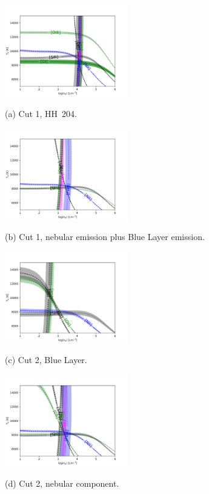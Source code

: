 \documentclass[twocolumn]{aastex63}
\begin{document}
\begin{figure}
\centering
  \begin{minipage}{7.5cm}
    \centering\includegraphics[height=4cm,width=\columnwidth]{physical_diag_HH204.png}

    \centerline{(a) Cut 1, HH~204.}
    \smallskip
  \end{minipage}
  \begin{minipage}{7.5cm}
    \centering\includegraphics[height=4cm,width=\columnwidth]{physical_diag_nebandbluelayer.png}
    \centerline{(b) Cut 1, nebular emission plus Blue Layer emission.}
    \smallskip
  \end{minipage}
 
  \begin{minipage}{7.5cm}
    \centering\includegraphics[height=4cm,width=\columnwidth]{physical_diag_blue_layer.png}
    \centerline{(c) Cut 2, Blue Layer.}
    \smallskip
  \end{minipage}
  \begin{minipage}{7.5cm}

    \centering\includegraphics[height=4cm,width=\columnwidth]{physical_diag_nebular.png}
    \centerline{(d) Cut 2, nebular component.}
    \smallskip
  \end{minipage}


\end{figure}
\end{document}
